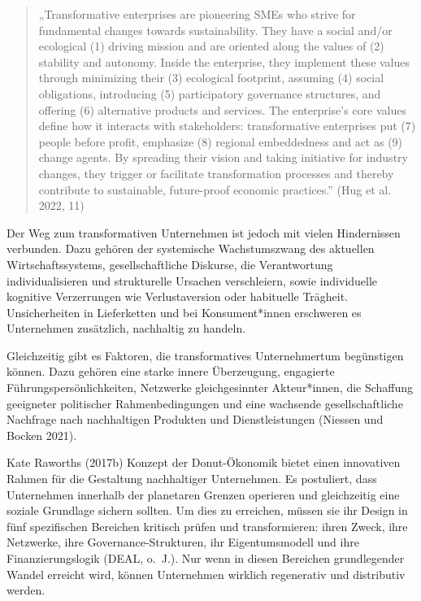 \documentclass[
  nswissgerman,
  a4paper,
  DIV=11,
  numbers=noendperiod,
  oneside,
  openany]{scrreprt}
\begin{document}
\begin{quote}
„Transformative enterprises are pioneering SMEs who strive for
fundamental changes towards sustainability. They have a social and/or
ecological (1) driving mission and are oriented along the values of (2)
stability and autonomy. Inside the enterprise, they implement these
values through minimizing their (3) ecological footprint, assuming (4)
social obligations, introducing (5) participatory governance structures,
and offering (6) alternative products and services. The enterprise's
core values define how it interacts with stakeholders: transformative
enterprises put (7) people before profit, emphasize (8) regional
embeddedness and act as (9) change agents. By spreading their vision and
taking initiative for industry changes, they trigger or facilitate
transformation processes and thereby contribute to sustainable,
future-proof economic practices.'' (Hug et al. 2022, 11)
\end{quote}

Der Weg zum transformativen Unternehmen ist jedoch mit vielen
Hindernissen verbunden. Dazu gehören der systemische Wachstumszwang des
aktuellen Wirtschaftssystems, gesellschaftliche Diskurse, die
Verantwortung individualisieren und strukturelle Ursachen verschleiern,
sowie individuelle kognitive Verzerrungen wie Verlustaversion oder
habituelle Trägheit. Unsicherheiten in Lieferketten und bei
Konsument*innen erschweren es Unternehmen zusätzlich, nachhaltig zu
handeln.

Gleichzeitig gibt es Faktoren, die transformatives Unternehmertum
begünstigen können. Dazu gehören eine starke innere Überzeugung,
engagierte Führungspersönlichkeiten, Netzwerke gleichgesinnter
Akteur*innen, die Schaffung geeigneter politischer Rahmenbedingungen und
eine wachsende gesellschaftliche Nachfrage nach nachhaltigen Produkten
und Dienstleistungen (Niessen und Bocken 2021).

Kate Raworths (2017b) Konzept der Donut-Ökonomik bietet einen
innovativen Rahmen für die Gestaltung nachhaltiger Unternehmen. Es
postuliert, dass Unternehmen innerhalb der planetaren Grenzen operieren
und gleichzeitig eine soziale Grundlage sichern sollten. Um dies zu
erreichen, müssen sie ihr Design in fünf spezifischen Bereichen kritisch
prüfen und transformieren: ihren Zweck, ihre Netzwerke, ihre
Governance-Strukturen, ihr Eigentumsmodell und ihre Finanzierungslogik
(DEAL, o.~J.). Nur wenn in diesen Bereichen grundlegender Wandel
erreicht wird, können Unternehmen wirklich regenerativ und distributiv
werden.
\end{document}

